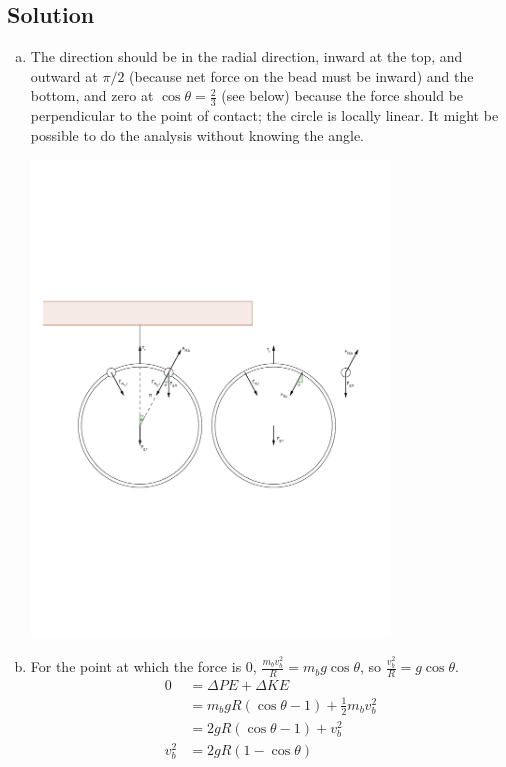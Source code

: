 \documentclass[solutions]{esg8012pset}
\begin{document}
\subsection{Solution}
\begin{enumerate}[a)]
 \item The direction should be in the radial direction, inward at the top, and outward at $\pi/2$ (because net force on the bead must be inward) and the bottom, and zero at $\cos\theta = \frac{2}{3}$ (see below) because the force should be perpendicular to the point of contact; the circle is locally linear.  It might be possible to do the analysis without knowing the angle. \par
 \begin{center}\includegraphics[width=0.75\textwidth]{2009-10-23_Diagram_7_1}\end{center}
 \item For the point at which the force is 0, $\frac{m_b v_b^2}{R} = m_b g\cos\theta$, so $\frac{v_b^2}{R} = g\cos\theta$.
   \begin{align*}
     0 & = \Delta PE + \Delta KE \\
       & = m_b g R(\cos\theta - 1) + \frac{1}{2}m_b v_b^2 \\
       & = 2 g R (\cos\theta - 1) + v_b^2 \\
     v_b^2 & = 2 g R(1 - \cos\theta) \\

\end{align*}
\end{enumerate}
\end{document}
